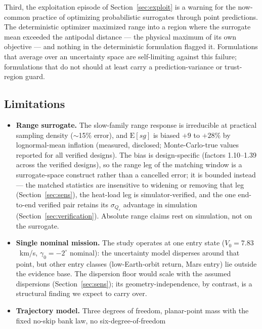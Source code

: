 Third, the exploitation episode of Section~\ref{sec:exploit} is a warning
for the now-common practice of optimizing probabilistic surrogates through
point predictions. The deterministic optimizer maximized range into a
region where the surrogate mean exceeded the antipodal distance --- the
physical maximum of its own objective --- and nothing in the deterministic
formulation flagged it. Formulations that average over an uncertainty
space are self-limiting against this failure; formulations that do not
should at least carry a prediction-variance or trust-region guard.

\subsection{Limitations}
\label{sec:limitations}

\begin{itemize}
  \item \textbf{Range surrogate.} The slow-family range response is
        irreducible at practical sampling density ($\sim$15\% error), and
        $\mathrm{E}[sg]$ is biased $+9$ to $+28\%$ by lognormal-mean
        inflation (measured, disclosed; Monte-Carlo-true values reported
        for all verified designs). The bias is design-specific (factors
        1.10--1.39 across the verified designs), so the range leg of the
        matching window is a surrogate-space construct rather than a
        cancelled error; it is bounded instead --- the matched statistics
        are insensitive to widening or removing that leg
        (Section~\ref{sec:sens}), the heat-load leg is
        simulator-verified, and the one end-to-end verified pair retains
        its $\sigma_{Q_s}$ advantage in simulation
        (Section~\ref{sec:verification}). Absolute range claims
        rest on simulation, not on the surrogate.
  \item \textbf{Single nominal mission.} The study operates at one entry
        state ($V_0=7.83$~km/s, $\gamma_0=-2^\circ$ nominal): the
        uncertainty model disperses around that point, but other entry
        classes (low-Earth-orbit return, Mars entry) lie outside the
        evidence base. The dispersion floor would scale with the assumed
        dispersions (Section~\ref{sec:sens}); its geometry-independence,
        by contrast, is a structural finding we expect to carry over.
  \item \textbf{Trajectory model.} Three degrees of freedom, planar-point
        mass with the fixed no-skip bank law, no six-degree-of-freedom

\end{itemize}
